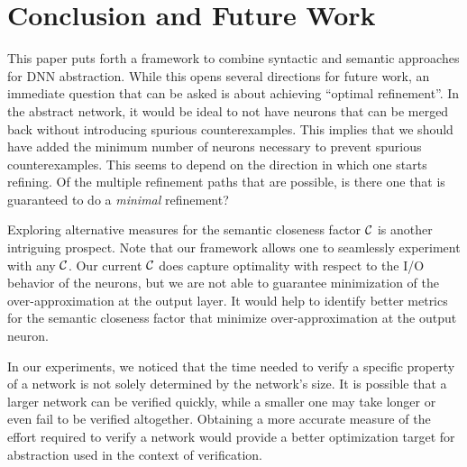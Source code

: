 \section{Conclusion and Future Work}


This paper puts forth a framework to combine syntactic and semantic approaches
for DNN abstraction. While this opens several directions for future work, an
immediate question that can be asked is about achieving ``optimal refinement''.
In the abstract network, it would be ideal to not have neurons that can be
merged back without introducing spurious counterexamples. This implies that we
should have added the minimum number of neurons necessary to prevent spurious
counterexamples. This seems to depend on the direction in which one starts
refining. Of the multiple refinement paths that are possible, is there one that
is guaranteed to do a \emph{minimal} refinement? 

Exploring alternative measures for the semantic closeness factor $\mathcal{C}$ is
another intriguing prospect. Note that our framework allows one to seamlessly
experiment with any $\mathcal{C}$. Our current $\mathcal{C}$ does capture optimality with
respect to the I/O behavior of the neurons, but we are not able to guarantee
minimization of the over-approximation at the output layer. It would help to
identify better metrics for the semantic closeness factor that minimize
over-approximation at the output neuron. 

In our experiments, we noticed that the time needed to verify a specific
property of a network is not solely determined by the network's size. It is
possible that a larger network can be verified quickly, while a smaller one may
take longer or even fail to be verified altogether. Obtaining a more accurate
measure of the effort required to verify a network would provide a better
optimization target for abstraction used in the context of verification.



